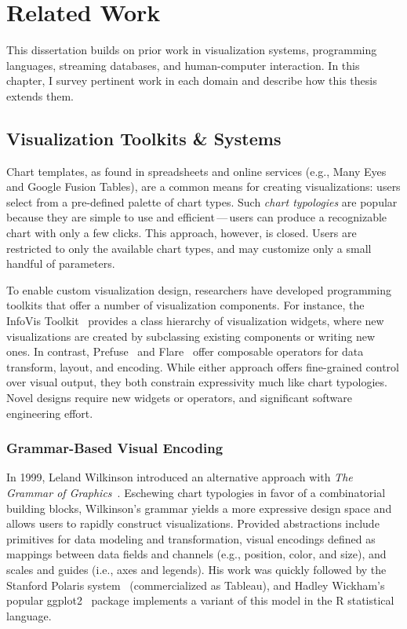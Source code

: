 \chapter{Related Work}
\label{sec:related_work}

This dissertation builds on prior work in visualization systems, programming
languages, streaming databases, and human-computer interaction. In this chapter,
I survey pertinent work in each domain and describe how this thesis extends
them.

\section{Visualization Toolkits \& Systems}

Chart templates, as found in spreadsheets and online services (e.g., Many
Eyes~\cite{ibm:manyeyes} and Google Fusion Tables), are a common means for
creating visualizations: users select from a pre-defined palette of chart types.
Such \emph{chart typologies} are popular because they are simple to use and
efficient\,---\,users can produce a recognizable chart with only a few clicks.
This approach, however, is closed. Users are restricted to only the available
chart types, and may customize only a small handful of parameters.

To enable custom visualization design, researchers have developed programming
toolkits that offer a number of visualization components. For instance, the
InfoVis Toolkit~\cite{fekete:ivtk} provides a class hierarchy of visualization
widgets, where new visualizations are created by subclassing existing components
or writing new ones. In contrast, Prefuse~\cite{heer:prefuse} and
Flare~\cite{flare} offer composable operators for data transform, layout, and
encoding. While either approach offers fine-grained control over visual output,
they both constrain expressivity much like chart typologies. Novel designs
require new widgets or operators, and significant software engineering effort.

\subsection{Grammar-Based Visual Encoding}

In 1999, Leland Wilkinson introduced an alternative approach with \emph{The
Grammar of Graphics}~\cite{wilkinson:grammar}. Eschewing chart typologies in
favor of a combinatorial building blocks, Wilkinson's grammar yields a more
expressive design space and allows users to rapidly construct visualizations.
Provided abstractions include primitives for data modeling and transformation,
visual encodings defined as mappings between data fields and channels (e.g.,
position, color, and size), and scales and guides (i.e., axes and legends). His
work was quickly followed by the Stanford Polaris system~\cite{stolte:polaris}
(commercialized as Tableau), and Hadley Wickham's popular
ggplot2~\cite{wickham:layered} package implements a variant of this model in the
R statistical language.


